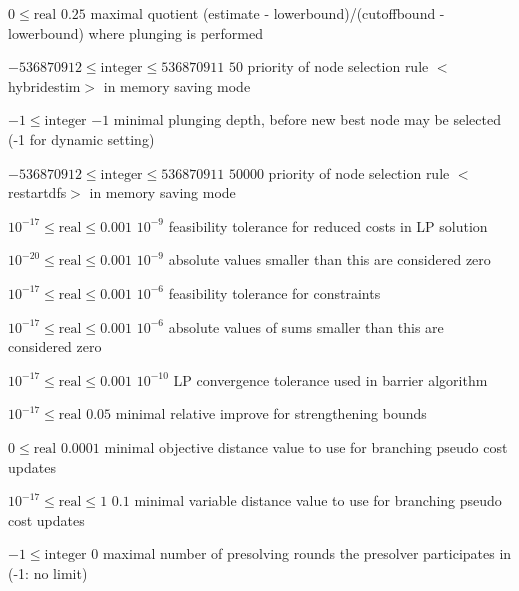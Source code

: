 %
{$0\leq\textrm{real}$}%
{$0.25$}%
{maximal quotient (estimate - lowerbound)/(cutoffbound - lowerbound) where plunging is performed}%
{}

%
{$-536870912\leq\textrm{integer}\leq536870911$}%
{$50$}%
{priority of node selection rule $<$hybridestim$>$ in memory saving mode}%
{}

%
{$-1\leq\textrm{integer}$}%
{$-1$}%
{minimal plunging depth, before new best node may be selected (-1 for dynamic setting)}%
{}

%
{$-536870912\leq\textrm{integer}\leq536870911$}%
{$50000$}%
{priority of node selection rule $<$restartdfs$>$ in memory saving mode}%
{}

%
{$10^{-17}\leq\textrm{real}\leq0.001$}%
{$10^{- 9}$}%
{feasibility tolerance for reduced costs in LP solution}%
{}

%
{$10^{-20}\leq\textrm{real}\leq0.001$}%
{$10^{- 9}$}%
{absolute values smaller than this are considered zero}%
{}

%
{$10^{-17}\leq\textrm{real}\leq0.001$}%
{$10^{- 6}$}%
{feasibility tolerance for constraints}%
{}

%
{$10^{-17}\leq\textrm{real}\leq0.001$}%
{$10^{- 6}$}%
{absolute values of sums smaller than this are considered zero}%
{}

%
{$10^{-17}\leq\textrm{real}\leq0.001$}%
{$10^{-10}$}%
{LP convergence tolerance used in barrier algorithm}%
{}

%
{$10^{-17}\leq\textrm{real}$}%
{$0.05$}%
{minimal relative improve for strengthening bounds}%
{}

%
{$0\leq\textrm{real}$}%
{$0.0001$}%
{minimal objective distance value to use for branching pseudo cost updates}%
{}

%
{$10^{-17}\leq\textrm{real}\leq1$}%
{$0.1$}%
{minimal variable distance value to use for branching pseudo cost updates}%
{}

%
{$-1\leq\textrm{integer}$}%
{$0$}%
{maximal number of presolving rounds the presolver participates in (-1: no limit)}%
{}

